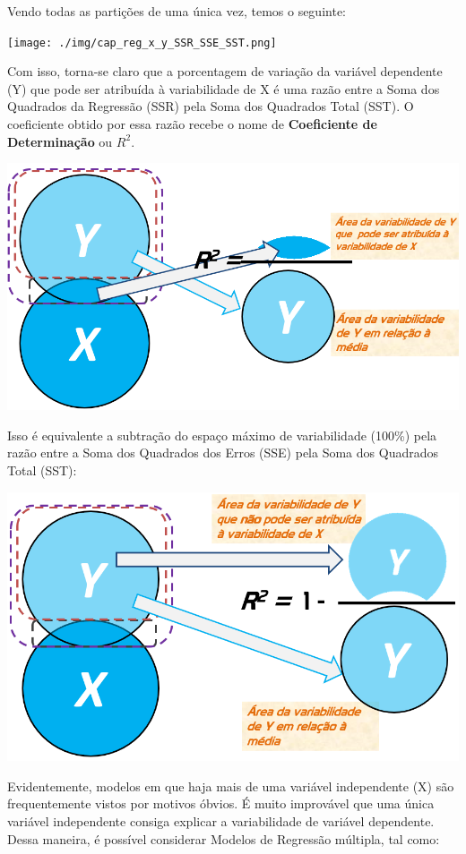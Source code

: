\documentclass[
]{book}
\begin{document}
Vendo todas as partições de uma única vez, temos o seguinte:

\texttt{[image: ./img/cap\_reg\_x\_y\_SSR\_SSE\_SST.png]}

Com isso, torna-se claro que a porcentagem de variação da variável dependente (Y) que pode ser atribuída à variabilidade de X é uma razão entre a Soma dos Quadrados da Regressão (SSR) pela Soma dos Quadrados Total (SST). O coeficiente obtido por essa razão recebe o nome de \textbf{Coeficiente de Determinação} ou \(R^2\).

\includegraphics{./img/cap_reg_r2.png}

Isso é equivalente a subtração do espaço máximo de variabilidade (100\%) pela razão entre a Soma dos Quadrados dos Erros (SSE) pela Soma dos Quadrados Total (SST):

\includegraphics{./img/cap_reg_r2_1.png}

Evidentemente, modelos em que haja mais de uma variável independente (X) são frequentemente vistos por motivos óbvios. É muito improvável que uma única variável independente consiga explicar a variabilidade de variável dependente. Dessa maneira, é possível considerar Modelos de Regressão múltipla, tal como:
\end{document}
